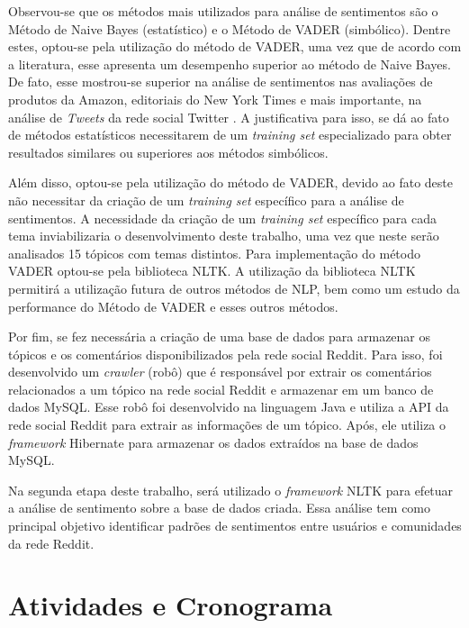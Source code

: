 Observou-se que os métodos mais utilizados para análise de sentimentos são o
Método de Naive Bayes (estatístico) e o Método de \ac{VADER} (simbólico). Dentre
estes, optou-se pela utilização do método de \ac{VADER}, uma vez que de acordo
com a literatura, esse apresenta um desempenho superior ao método de Naive
Bayes. De fato, esse mostrou-se superior na análise de sentimentos nas avaliações de
produtos da Amazon, editoriais do New York Times e mais importante, na análise
de \textit{Tweets} da rede social Twitter \cite{SentimentinSocialMedia}. A
justificativa para isso, se dá ao fato de métodos estatísticos necessitarem de um \textit{training set}
especializado para obter resultados similares ou superiores aos métodos
simbólicos. 

Além disso, optou-se pela utilização do método de \ac{VADER}, devido
ao fato deste não necessitar da criação de um \textit{training set} específico
para a análise de sentimentos. A necessidade da criação de um \textit{training
set} específico para cada tema inviabilizaria o desenvolvimento deste trabalho,
uma vez que neste serão analisados 15 tópicos com temas distintos. Para
implementação do método \ac{VADER} optou-se pela biblioteca \ac{NLTK}. A
utilização da biblioteca \ac{NLTK} permitirá a utilização futura de outros
métodos de \ac{NLP}, bem como um estudo da performance do Método de \ac{VADER} e esses outros métodos.
 
Por fim, se fez necessária a criação de uma base de dados para armazenar os
tópicos e os comentários disponibilizados pela rede social Reddit. Para isso,
foi desenvolvido um \textit{crawler} (robô) que é responsável por extrair os
comentários relacionados a um tópico na rede social Reddit e armazenar em um
banco de dados MySQL. Esse robô foi desenvolvido na linguagem Java e utiliza a
API da rede social Reddit para extrair as informações de um tópico. Após, ele
utiliza o \textit{framework} Hibernate para armazenar os dados extraídos na
base de dados MySQL.

Na segunda etapa deste trabalho, será utilizado o \textit{framework} \ac{NLTK}
para efetuar a análise de sentimento sobre a base de dados criada. Essa análise
tem como principal objetivo identificar padrões de sentimentos entre
usuários e comunidades da rede Reddit.

\section{Atividades e Cronograma}

